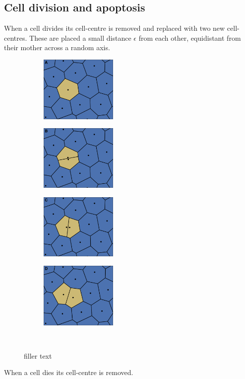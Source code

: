 \documentclass[a4paper]{article}
\begin{document}
\subsection{Cell division and apoptosis}
When a cell divides its cell-centre is removed and replaced with two new cell-centres. These are placed a small distance $\epsilon$ from each other, equidistant from their mother across a random axis. 
\begin{figure}[htbp]
\centering
\begin{subfigure}{0.24\textwidth}
	\centering
	\includegraphics[width=3.7cm]{divide_1.png}
	\label{fig:divideA}
\end{subfigure} \hspace{0.02cm}
\centering
\begin{subfigure}{0.24\textwidth}
	\centering
	\includegraphics[width=3.7cm]{divide_2.png}
	\label{fig:divideA}
\end{subfigure} \hspace{0.02cm}
\centering
\begin{subfigure}{0.24\textwidth}
	\centering
	\includegraphics[width=3.7cm]{divide_3.png}
	\label{fig:divideA}
\end{subfigure} \hspace{0.02cm}
\centering
\begin{subfigure}{0.24\textwidth}
	\centering
	\includegraphics[width=3.7cm]{divide_4.png}
	\label{fig:divideA}
\end{subfigure} \\
\caption{filler text}
\label{fig:manmade}
\end{figure}
When a cell dies its cell-centre is removed.
\end{document}
